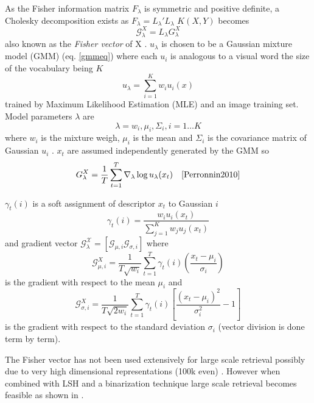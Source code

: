 \documentclass[english,12pt,a4paper,pdftex,elec,utf8]{aaltothesis}
\begin{document}
As the Fisher information matrix $F_\lambda$ is symmetric and positive definite, a Cholesky decomposition exists as $F_\lambda = L_\lambda'L_\lambda$ $K(X,Y)$ becomes
\begin{equation}\label{fishervectorfinal}
\mathcal{G}_\lambda^X = L_\lambda G_\lambda^X
\end{equation}
also known as the \emph{Fisher vector} of X \cite{Perronnin2010}. $u_\lambda$ is chosen to be a Gaussian mixture model (GMM) (eq. \ref{gmmeq}) where each $u_i$ is analogous to a visual word the size of the vocabulary being $K$ \cite{Perronnin2010a}
\begin{equation}\label{gmmeq}
u_\lambda = \sum_{i=1}^K w_iu_i(x)
\end{equation}
trained by Maximum Likelihood Estimation (MLE) and an image training set. Model parameters $\lambda$ are
\begin{equation}\label{lambdaparams}
\lambda = {w_i,\mu_i, \Sigma_i, i=1 \ldots K}
\end{equation}
where $w_i$ is the mixture weigh, $\mu_i$ is the mean and $\Sigma_i$ is the covariance matrix of Gaussian $u_i$ \cite{Perronnin2010}. $x_t$ are assumed independently generated by the GMM so
\begin{equation}\label{gmm}
G_\lambda^X = \frac{1}{T}\sum_{t=1}^T \nabla_\lambda \log u_\lambda(x_t) \quad \cite{Perronnin2010}
\end{equation}

$\gamma_t(i)$ is a soft assignment of descriptor $x_t$ to Gaussian $i$
\begin{equation} \label{descriptortogaussian}
\gamma_t(i) = \frac{w_iu_i(x_t)}{\sum_{j=1}^Kw_ju_j(x_t)}
\end{equation}
and gradient vector $\mathcal{G_\lambda^X} = [\mathcal{G}_{\mu,i} \mathcal{G}_{\sigma,i}] $ where
\begin{equation}\label{fishervectormu}
\mathcal{G}_{\mu,i}^X = \frac{1}{T\sqrt{w_i}} \sum^T_{t=1} \gamma_t(i)\left(\frac{x_t - \mu_i}{\sigma_i}\right)
\end{equation}
is the gradient with respect to the mean $\mu_i$ and
\begin{equation}\label{fishervectorsigma}
\mathcal{G}_{\sigma,i}^X = \frac{1}{T\sqrt{2w_i}} \sum_{t=1}^T \gamma_t(i)\left[\frac{(x_t - \mu_i)^2}{\sigma_i^2} -1\right]
  \end{equation}
is the gradient with respect to the standard deviation $\sigma_i$ (vector division is done term by term). \cite{Perronnin2010}

The Fisher vector has not been used extensively for large scale retrieval possibly due to very high dimensional representations (100k even) \cite{Perronnin2010a}. However when combined with LSH and a binarization technique large scale retrieval becomes feasible as shown in \cite{Perronnin2010a}.
\end{document}
